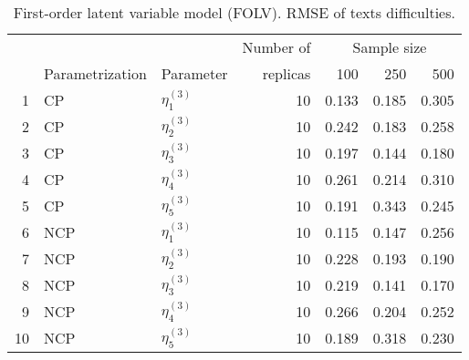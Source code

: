 \begin{table}[H]
	\centering
	\begin{tabular}{rllrrrr}
		\hline
		\multicolumn{3}{c}{ } & Number of &\multicolumn{3}{c}{ Sample size } \\ 
		\cmidrule(rl){5-7}
		& Parametrization & Parameter & replicas & 100 & 250 & 500 \\  
		\hline\hline
		1 & CP & $\eta^{(3)}_{1}$ &   10 & 0.133 & 0.185 & 0.305 \\ 
		2 & CP & $\eta^{(3)}_{2}$ &   10 & 0.242 & 0.183 & 0.258 \\ 
		3 & CP & $\eta^{(3)}_{3}$ &   10 & 0.197 & 0.144 & 0.180 \\ 
		4 & CP & $\eta^{(3)}_{4}$ &   10 & 0.261 & 0.214 & 0.310 \\ 
		5 & CP & $\eta^{(3)}_{5}$ &   10 & 0.191 & 0.343 & 0.245 \\ 
		\hline
		6 & NCP & $\eta^{(3)}_{1}$ &   10 & 0.115 & 0.147 & 0.256 \\ 
		7 & NCP & $\eta^{(3)}_{2}$ &   10 & 0.228 & 0.193 & 0.190 \\ 
		8 & NCP & $\eta^{(3)}_{3}$ &   10 & 0.219 & 0.141 & 0.170 \\ 
		9 & NCP & $\eta^{(3)}_{4}$ &   10 & 0.266 & 0.204 & 0.252 \\ 
		10 & NCP & $\eta^{(3)}_{5}$ &   10 & 0.189 & 0.318 & 0.230 \\ 
		\hline
	\end{tabular}
	\caption[First-order latent variable model (FOLV). RMSE of texts difficulties.]%
	{First-order latent variable model (FOLV). RMSE of texts difficulties.}
	\label{tab:FOLV_RMSE_texts_diff}
\end{table}
%
